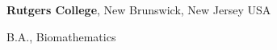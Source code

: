 \documentclass[margin,line]{resume}
\begin{document}
\begin{resume}
{\bf Rutgers College}, New Brunswick, New Jersey USA\\
\vspace*{-.1in}
\begin{list1}
\item[] B.A., Biomathematics
\end{list1}


\end{resume}
\end{document}
